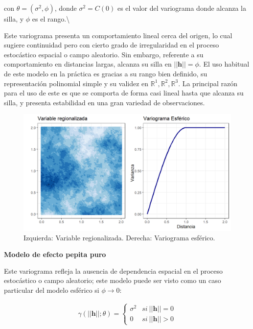 \documentclass[
]{book}
\begin{document}
con \(\theta=(\sigma^2,\phi)\), donde \(\sigma^2=C(0)\) es el valor del variograma donde alcanza la silla, y \(\phi\) es el rango.\textbackslash{}

Este variograma presenta un comportamiento lineal cerca del origen, lo cual sugiere continuidad pero con cierto grado de irregularidad en el proceso estocástico espacial o campo aleatorio. Sin embargo, referente a su comportamiento en distancias largas, alcanza su silla en \(||\textbf{h}||=\phi\). El uso habitual de este modelo en la práctica es gracias a su rango bien definido, su representación polinomial simple y su validez en \(\mathbb{R}^1,\mathbb{R}^2,\mathbb{R}^3\). La principal razón para el uso de este es que se comporta de forma casi lineal hasta que alcanza su silla, y presenta estabilidad en una gran variedad de observaciones.

\begin{figure}
\includegraphics[width=17.78in]{figuras/otros/sph_var} \caption{Izquierda: Variable regionalizada. Derecha: Variograma esférico.}\label{fig:sphvar}
\end{figure}

\textbf{Modelo de efecto pepita puro}

Este variograma refleja la ausencia de dependencia espacial en el proceso estocástico o campo aleatorio; este modelo puede ser visto como un caso particular del modelo esférico si \(\phi \to 0\):

\begin{align}        
    \gamma(||\textbf{h}||;\theta) = \left \{ \begin{matrix} \sigma^2&  si \ ||\textbf{h}|| =0\\
    0 &  si\ ||\textbf{h}||>0 \end{matrix}\right.
    \end{align}
\end{document}
